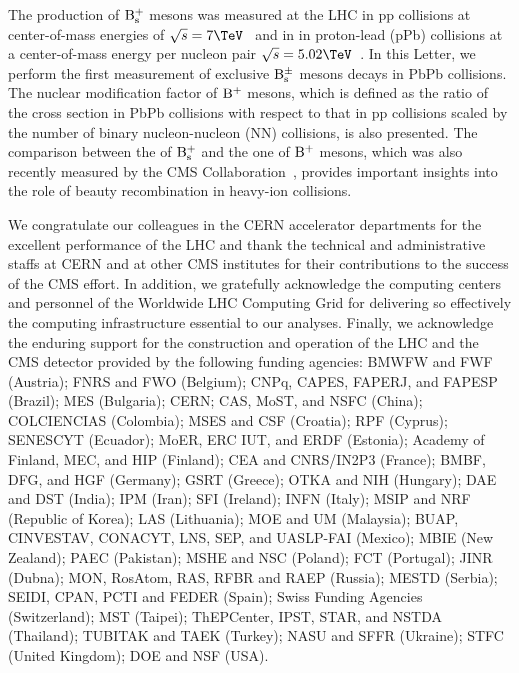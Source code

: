 The production of $\rm B_{\rm s }^{+}$ mesons was measured at the LHC in pp collisions at center-of-mass energies of $\sqrts=7\TeV$~\cite{Chatrchyan:2011vh}
and in in proton-lead (pPb) collisions at a center-of-mass energy per nucleon pair $\sqrts=5.02\TeV$~\cite{Khachatryan:2015uja}.
In this Letter, we perform the first measurement of exclusive $\rm B_{\rm s }^{\pm}$ mesons decays in PbPb collisions. The nuclear modification factor \RAA of $\rm B^{+}$ mesons, 
which is defined as the ratio of the cross section in PbPb collisions with respect to that in pp collisions scaled by the number of binary nucleon-nucleon (NN) collisions, 
is also presented. The comparison between the \RAA of $\rm B_{\rm s }^{+}$ and the one of $\rm B^{+}$ mesons, which was also recently measured by the CMS Collaboration~\cite{PhysRevLett.119.152301}, provides
important insights into the role of beauty recombination in heavy-ion collisions. 
\begin{acknowledgments}
We congratulate our colleagues in the CERN accelerator departments for the excellent performance of the LHC and thank the technical and administrative staffs at CERN and at other CMS institutes for their contributions to the success of the CMS effort. In addition, we gratefully acknowledge the computing centers and personnel of the Worldwide LHC Computing Grid for delivering so effectively the computing infrastructure essential to our analyses. Finally, we acknowledge the enduring support for the construction and operation of the LHC and the CMS detector provided by the following funding agencies: BMWFW and FWF (Austria); FNRS and FWO (Belgium); CNPq, CAPES, FAPERJ, and FAPESP (Brazil); MES (Bulgaria); CERN; CAS, MoST, and NSFC (China); COLCIENCIAS (Colombia); MSES and CSF (Croatia); RPF (Cyprus); SENESCYT (Ecuador); MoER, ERC IUT, and ERDF (Estonia); Academy of Finland, MEC, and HIP (Finland); CEA and CNRS/IN2P3 (France); BMBF, DFG, and HGF (Germany); GSRT (Greece); OTKA and NIH (Hungary); DAE and DST (India); IPM (Iran); SFI (Ireland); INFN (Italy); MSIP and NRF (Republic of Korea); LAS (Lithuania); MOE and UM (Malaysia); BUAP, CINVESTAV, CONACYT, LNS, SEP, and UASLP-FAI (Mexico); MBIE (New Zealand); PAEC (Pakistan); MSHE and NSC (Poland); FCT (Portugal); JINR (Dubna); MON, RosAtom, RAS, RFBR and RAEP (Russia); MESTD (Serbia); SEIDI, CPAN, PCTI and FEDER (Spain); Swiss Funding Agencies (Switzerland); MST (Taipei); ThEPCenter, IPST, STAR, and NSTDA (Thailand); TUBITAK and TAEK (Turkey); NASU and SFFR (Ukraine); STFC (United Kingdom); DOE and NSF (USA).
\end{acknowledgments}





